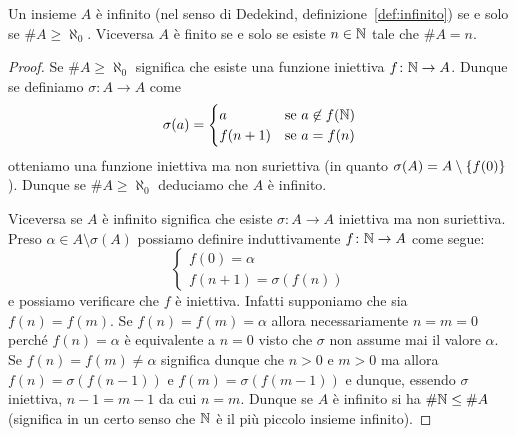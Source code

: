\begin{theorem}
Un insieme $A$ è infinito (nel senso di Dedekind, definizione~\ref{def:infinito})
se e solo se $\# A \ge \aleph_0$.
Viceversa $A$ è finito se e solo se esiste $n\in\mathbb N$ tale che $\# A = n$.
\end{theorem}
%
\begin{proof}
\begin{comment}
E' facile mostrare che se $\#\Enclose n \le \#Enclose m$ allora
$\#\Enclose{m+1} \le \#\Enclose{n+1}$ (basta prendere la iniezione 
$\Enclose n \to \Enclose m$ 
ed estenderla al punto aggiuntivo $n\mapsto m$). 
Ma è vero anche il viceversa: se $\#\Enclose{m+1} \le \#Enclose{n+1}$ 
allora $\#\Enclose{m} \le \#\Enclose{n}$. 
Infatti data una funzione iniettiva 
$f\colon \Enclose{m+1}\to \Enclose{n+1}$ consideriamo il punto 
$k=f^{-1}(n)$ e componiamo $f$ a destra con la bigezione 
che scambia $k$ con $m$. In tal modo otteniamo una iniezione 
che manda $m\mapsto n$ e che quindi è anche una iniezione 
se ristretta a $\Enclose{m}\to\Enclose{n}$.

Dunque abbiamo mostrato che $\#\Enclose n \le \#Enclose m$
è equivalente a $\#Enclose{n+1} \le \#Enclose{m+1}$.
Ma allora procedendo per induzione si può facilmente 
dimostrare che $\#Enclose{n} \le \#Enclose{m}$
è equivalente a $n \le m$. 

Lo stesso procedimento si può ripetere con le bigezioni 
(oppure si può applicare il teorema~\ref{th:cantor_bernstein} di Cantor-Bernstein)
per ottenere che $\#Enclose{n}=\#Enclose{m}$ 
è equivalente a $m=n$.
\end{comment}

Se $\#A \ge \aleph_0$ significa che esiste una funzione 
iniettiva $f\colon \mathbb N\to A$. 
Dunque se definiamo $\sigma \colon A \to A$ come
\[
\sigma(a) = \begin{cases}
  a & \text{se $a\not\in f(\mathbb N)$}\\
  f(n+1) & \text{se $a=f(n)$}
\end{cases}
\]
otteniamo una funzione iniettiva ma non suriettiva 
(in quanto $\sigma(A) = A\setminus{\left\{ f(0) \right\}}$).
Dunque se $\#A\ge \aleph_0$ deduciamo che $A$ è infinito.

Viceversa se $A$ è infinito significa che esiste $\sigma\colon A \to A$ 
iniettiva ma non suriettiva. 
Preso $\alpha \in A \setminus\sigma(A)$
possiamo definire induttivamente $f\colon \mathbb N\to A$ come segue:
\[
\begin{cases}
  f(0) = \alpha\\
  f(n+1) = \sigma(f(n))
\end{cases}
\]
e possiamo verificare che $f$ è iniettiva. 
Infatti supponiamo che sia $f(n)=f(m)$.
Se $f(n)=f(m)=\alpha$ allora necessariamente $n=m=0$ 
perché $f(n)=\alpha$ è equivalente a $n=0$ visto che $\sigma$
non assume mai il valore $\alpha$.
Se $f(n)=f(m)\neq \alpha$ significa dunque che $n>0$ e $m>0$
ma allora $f(n)=\sigma(f(n-1))$ e $f(m)=\sigma(f(m-1))$
e dunque, essendo $\sigma$ iniettiva, $n-1=m-1$ da cui $n=m$. 
Dunque se $A$ è infinito si ha $\#\mathbb N\le \#A$
(significa in un certo senso che $\mathbb N$ è il più piccolo insieme infinito).


\end{proof}
